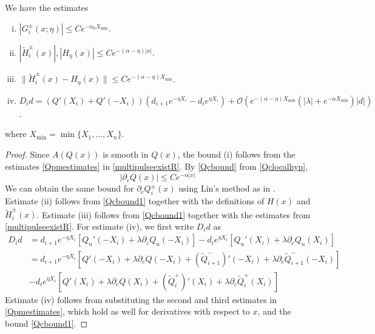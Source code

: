 \documentclass[thesis.tex]{subfiles}
\begin{document}
\begin{lemma}\label{lemma:weightedest}
We have the estimates
\begin{enumerate}[(i)]
	\item $|G_i^\pm(x; \eta)| \leq C e^{-\alpha_0 X_{\min}}$.
	\item $|\tilde{H}_i^\pm(x)|, |H_\eta(x)| \leq C e^{-(\alpha - \eta)|x|}$.
	\item $\|\tilde{H}_i^\pm(x) - H_\eta(x) \|  \leq C e^{-(\alpha - \eta) X_{\min}} $.
	\item $D_i d = ( Q'(X_i) + Q'(-X_i) )(d_{i+1} e^{-\eta X_i} - d_i e^{\eta X_i}) + \mathcal{O} \left( e^{-(\alpha - \eta) X_{\min}}\left( |\lambda| +  e^{-\alpha X_{\min}} \right) |d| \right)$.
\end{enumerate}
where $X_{\min} = \min\{X_1, \dots, X_n\}$.
\begin{proof}
Since $A(Q(x))$ is smooth in $Q(x)$, the bound (i) follows from the estimates \cref{Qpmestimates} in \cref{multipulseexistR}. By \cref{Qcbound} from \cref{Qclocalhyp},
\begin{equation}\label{Qcbound1}
|\partial_c Q(x)| \leq C e^{-\alpha|x|}
\end{equation}
We can obtain the same bound for $\partial_c Q_i^\pm(x)$ using Lin's method as in \cite{SandstedeStrut,Sandstede1993}. Estimate (ii) follows from \cref{Qcbound1} together with the definitions of $H(x)$ and $\tilde{H}_i^\pm(x)$. Estimate (iii) follows from \cref{Qcbound1} together with the estimates from \cref{multipulseexistR}. For estimate (iv), we first write $D_i d$ as
\begin{align*}
D_i d &= d_{i+1} e^{-\eta X_i}[ Q_n'(-X_i) + \lambda \partial_c Q_n(-X_i)] 
- d_i e^{\eta X_i}[ Q_n'(X_i) + \lambda \partial_c Q_n(X_i)]  \\
&= d_{i+1} e^{-\eta X_i} [ Q'(-X_i) + \lambda \partial_c Q(-X_i) + (\tilde{Q}_{i+1}^-)'(-X_i) + \lambda  \partial_c \tilde{Q}_{i+1}^-(-X_i)] \\
&- d_i e^{\eta X_i} [ Q'(X_i) + \lambda \partial_c Q(X_i) + (\tilde{Q}_i^+)'(X_i) + \lambda \partial_c \tilde{Q}_i^+(X_i)] 
\end{align*}
Estimate (iv) follows from substituting the second and third estimates in \cref{Qpmestimates}, which hold as well for derivatives with respect to $x$, and the bound \cref{Qcbound1}.	
\end{proof}
\end{lemma}
\end{document}
